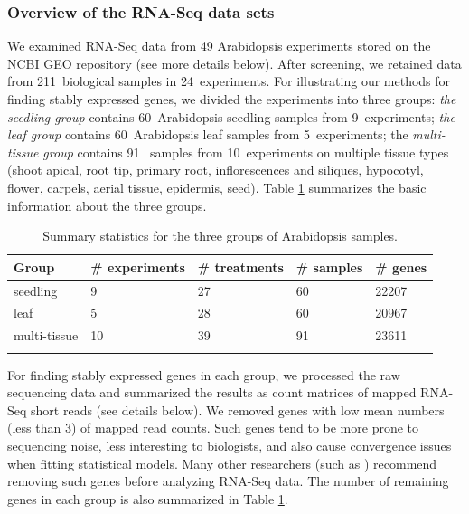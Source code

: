 \documentclass[letterpaper,12pt]{article}
\newcommand{\howmanySamples}{211~}
\newcommand{\howmanylab}{24~}
\newcommand{\howmanyseedlingsample}{60~}
\newcommand{\howmanyleafsample}{60~}
\newcommand{\howmanytissuesample}{91~}
\newcommand{\howmanyseedlingexperiment}{9~}
\newcommand{\howmanyleafexperiment}{5~}
\newcommand{\howmanytissueexperiment}{10~}
\begin{document}
\subsubsection*{Overview of the RNA-Seq data sets}
We examined RNA-Seq data from 49 Arabidopsis experiments stored on the NCBI
GEO repository (see more details below). After screening, we retained data
from \howmanySamples biological samples in \howmanylab experiments.  For illustrating our methods
for finding stably expressed genes, we divided the experiments into three
groups: \textit{the seedling group} contains \howmanyseedlingsample Arabidopsis seedling samples
from \howmanyseedlingexperiment experiments; \textit{ the leaf group} contains \howmanyleafsample Arabidopsis leaf
samples from \howmanyleafexperiment experiments;  the \textit{multi-tissue group} contains \howmanytissuesample
samples from \howmanytissueexperiment experiments on multiple tissue types (shoot apical, root tip,
primary root, inflorescences and siliques, hypocotyl, flower, carpels, aerial
tissue, epidermis, seed).  Table \ref{table:TableSet3} summarizes the basic information about
the three groups.
\begin{table}[!ht]
    \centering
    \caption{Summary statistics for the three groups of Arabidopsis samples.}
    \begin{tabular}{lp{2.4cm}p{2.3cm}p{2cm}p{1.5cm}} \hline
	Group & \#  experiments & \# treatments  & \# samples & \# genes \\ \hline
	seedling &   9 &  27 &  60 & 22207 \\ 
	leaf &   5 &  28 &  60 & 20967 \\ 
	multi-tissue &  10 &  39 &  91 & 23611 \\ \hline
	\label{table:TableSet3}
    \end{tabular}
\end{table}

For finding stably expressed genes in each group, we processed the raw
sequencing data and summarized the results as count matrices of mapped RNA-Seq
short reads (see details below).  We removed genes with low mean numbers (less
than 3) of mapped read counts.  Such genes tend to be more prone to sequencing
noise, less interesting to biologists, and also cause convergence issues when
fitting statistical models. Many other researchers (such as \citealt{anders2013count})
recommend removing such genes before analyzing RNA-Seq data.  The number of
remaining genes in each group is also summarized in Table
\ref{table:TableSet3}.
\end{document}
